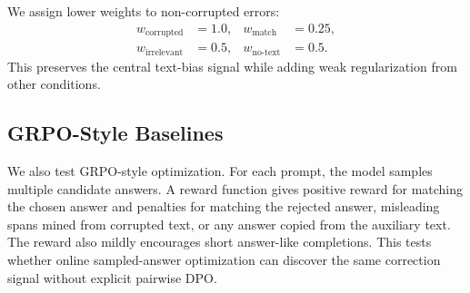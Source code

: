 We assign lower weights to non-corrupted errors:
\begin{equation}
\begin{aligned}
w_{\mathrm{corrupted}}&=1.0, &
w_{\mathrm{match}}&=0.25,\\
w_{\mathrm{irrelevant}}&=0.5, &
w_{\mathrm{no\text{-}text}}&=0.5.
\end{aligned}
\end{equation}
This preserves the central text-bias signal while adding weak regularization from other conditions.

\subsection{GRPO-Style Baselines}

We also test GRPO-style optimization.
For each prompt, the model samples multiple candidate answers.
A reward function gives positive reward for matching the chosen answer and penalties for matching the rejected answer, misleading spans mined from corrupted text, or any answer copied from the auxiliary text.
The reward also mildly encourages short answer-like completions.
This tests whether online sampled-answer optimization can discover the same correction signal without explicit pairwise DPO.
